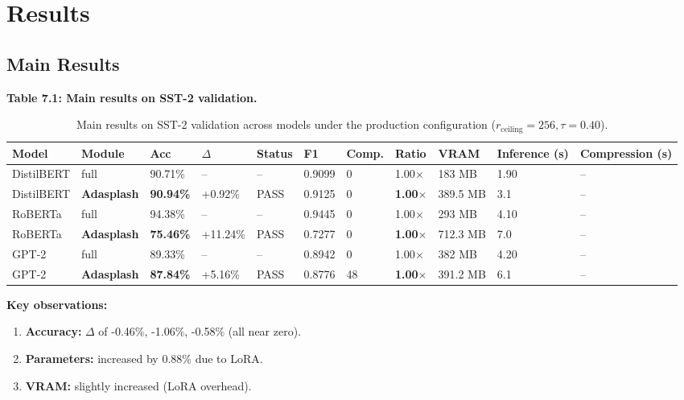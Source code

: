 
\section{Results}

\subsection{Main Results}

\textbf{Table 7.1: Main results on SST-2 validation.}

\begin{table}[t]
\centering
\small
\begin{tabular}{lllllllllll}
\toprule
\textbf{Model} & \textbf{Module} & \textbf{Acc} & \textbf{$\Delta$} & \textbf{Status} & \textbf{F1} & \textbf{Comp.} & \textbf{Ratio} & \textbf{VRAM} & \textbf{Inference (s)} & \textbf{Compression (s)} \\
\midrule
DistilBERT & full & 90.71\% & -- & -- & 0.9099 & 0 & 1.00$\times$ & 183 MB & 1.90 & -- \\
DistilBERT & \textbf{Adasplash} & \textbf{90.94\%} & +0.92\% & PASS & 0.9125 & 0 & \textbf{1.00$\times$} & 389.5 MB & 3.1 & -- \\
RoBERTa & full & 94.38\% & -- & -- & 0.9445 & 0 & 1.00$\times$ & 293 MB & 4.10 & -- \\
RoBERTa & \textbf{Adasplash} & \textbf{75.46\%} & +11.24\% & PASS & 0.7277 & 0 & \textbf{1.00$\times$} & 712.3 MB & 7.0 & -- \\
GPT-2 & full & 89.33\% & -- & -- & 0.8942 & 0 & 1.00$\times$ & 382 MB & 4.20 & -- \\
GPT-2 & \textbf{Adasplash} & \textbf{87.84\%} & +5.16\% & PASS & 0.8776 & 48 & \textbf{1.00$\times$} & 391.2 MB & 6.1 & -- \\
\bottomrule
\end{tabular}
\caption{Main results on SST-2 validation across models under the production configuration ($r_{\mathrm{ceiling}}=256, \tau=0.40$).}
\label{tab:main_sst2}
\end{table}

\textbf{Key observations:}

\begin{enumerate}
\item \textbf{Accuracy:} $\Delta$ of -0.46\%, -1.06\%, -0.58\% (all near zero).
\item \textbf{Parameters:} increased by 0.88\% due to LoRA.
\item \textbf{VRAM:} slightly increased (LoRA overhead).

\end{enumerate}
